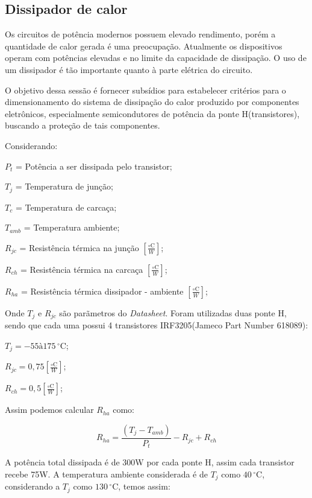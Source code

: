 \subsection{Dissipador de calor}

Os circuitos de potência modernos possuem elevado rendimento, porém a quantidade de
calor gerada é uma preocupação. Atualmente os dispositivos operam com potências elevadas
e no limite da capacidade de dissipação. O uso de um dissipador é tão importante quanto à
parte elétrica do circuito.

O objetivo dessa sessão é fornecer subsídios para estabelecer critérios para o
dimensionamento do sistema de dissipação do calor produzido por componentes eletrônicos,
especialmente semicondutores de potência da ponte H(transistores), buscando a proteção de
tais componentes.

Considerando:

$P_t$ = Potência a ser dissipada pelo transistor;

$T_j$ = Temperatura de junção;

$T_c$ = Temperatura de carcaça;

$T_{amb}$ = Temperatura ambiente;

$R_{jc}$ = Resistência térmica na junção $[\frac{{\circ}\mathrm{C}}{W}]$;

$R_{ch}$ = Resistência térmica na carcaça $[\frac{{\circ}\mathrm{C}}{W}]$;

$R_{ha}$ = Resistência térmica dissipador - ambiente $[\frac{{\circ}\mathrm{C}}{W}]$;

Onde $T_j$ e $R_{jc}$ são parãmetros do \textit{Datasheet}. Foram utilizadas duas ponte H, sendo
que cada uma possui 4 transistores IRF3205(Jameco Part Number 618089)\cite{jameco}:

$T_j = -55 à 175\,^{\circ}\mathrm{C}$;

$R_{jc} = 0,75[\frac{{\circ}\mathrm{C}}{W}]$;

$R_{ch} = 0,5[\frac{{\circ}\mathrm{C}}{W}]$;

Assim podemos calcular $R_{ha}$ como:

\begin{equation}
 R_{ha} = \frac{(T_j - T_{amb})}{P_t} - R_{jc} + R_{ch}
\end{equation}

A potência total dissipada é de 300W por cada ponte H, assim cada transistor recebe 75W. A
temperatura ambiente considerada é de $T_j$ como $40\,^{\circ}\mathrm{C}$, considerando a $T_j$ como $130\,^{\circ}\mathrm{C}$,
temos assim:


